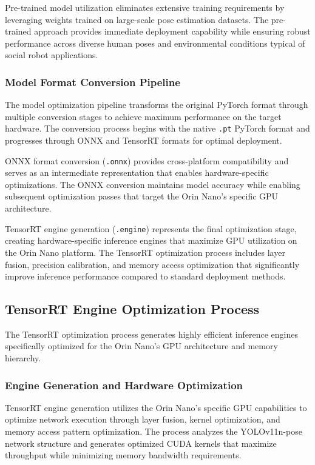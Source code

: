 Pre-trained model utilization eliminates extensive training requirements by leveraging weights trained on large-scale pose estimation datasets. The pre-trained approach provides immediate deployment capability while ensuring robust performance across diverse human poses and environmental conditions typical of social robot applications.

\subsubsection{Model Format Conversion Pipeline}

The model optimization pipeline transforms the original PyTorch format through multiple conversion stages to achieve maximum performance on the target hardware. The conversion process begins with the native \texttt{.pt} PyTorch format and progresses through ONNX and TensorRT formats for optimal deployment.

ONNX format conversion (\texttt{.onnx}) provides cross-platform compatibility and serves as an intermediate representation that enables hardware-specific optimizations. The ONNX conversion maintains model accuracy while enabling subsequent optimization passes that target the Orin Nano's specific GPU architecture.

TensorRT engine generation (\texttt{.engine}) represents the final optimization stage, creating hardware-specific inference engines that maximize GPU utilization on the Orin Nano platform. The TensorRT optimization process includes layer fusion, precision calibration, and memory access optimization that significantly improve inference performance compared to standard deployment methods.

\subsection{TensorRT Engine Optimization Process}

The TensorRT optimization process generates highly efficient inference engines specifically optimized for the Orin Nano's GPU architecture and memory hierarchy.

\subsubsection{Engine Generation and Hardware Optimization}

TensorRT engine generation utilizes the Orin Nano's specific GPU capabilities to optimize network execution through layer fusion, kernel optimization, and memory access pattern optimization. The process analyzes the YOLOv11n-pose network structure and generates optimized CUDA kernels that maximize throughput while minimizing memory bandwidth requirements.


